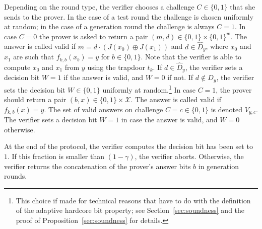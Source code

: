 \documentclass[11pt]{article}
\theoremstyle{remark}
\theoremstyle{definition}
\newcommand{\mX}{\ensuremath{\mathcal{X}}}
\newcommand{\inj}{J}
\begin{document}
Depending on the round type, the verifier chooses a challenge $C\in\{0,1\}$ that she sends to the prover. In the case of a test round the challenge is chosen uniformly at random; in the case of a generation round the challenge is always $C=1$. In case $C=0$ the prover is asked to return a pair $(m,d)\in \{0,1\}\times\{0,1\}^w$. The answer is called valid if $m=d\cdot(\inj(x_0)\oplus \inj(x_1))$ and $d\in\hat{D}_{y}$, where $x_0$ and $x_1$ are such that $f_{k,b}(x_b)=y$ for $b\in \{0,1\}$. Note that the verifier is able to compute $x_0$ and $x_1$ from $y$ using the trapdoor $t_k$. If $d\in\hat{D}_y$, the verifier sets a decision bit $W=1$ if the answer is valid, and $W=0$ if not. If $d\notin \hat{D}_y$, the verifier sets the decision bit $W\in\{0,1\}$ uniformly at random.\footnote{This choice if made for technical reasons that have to do with the definition of the adaptive hardcore bit property; see Section~\ref{sec:soundness} and the proof of Proposition~\ref{sec:soundness} for details.}
In case $C=1$, the prover should return  a pair $(b,x)\in \{0,1\}\times\mX$. The answer is called valid if $f_{k,b}(x)=y$. The set of valid answers on challenge $C=c\in\{0,1\}$ is denoted $V_{y,c}$. The verifier sets a decision bit $W=1$ in case the answer is valid, and $W=0$ otherwise. 

At the end of the protocol, the verifier computes the decision bit has been set to $1$. If this fraction is smaller than $(1-\gamma)$, the verifier aborts. Otherwise, the verifier returns the concatenation of the prover's answer bits $b$ in generation rounds.
\end{document}
